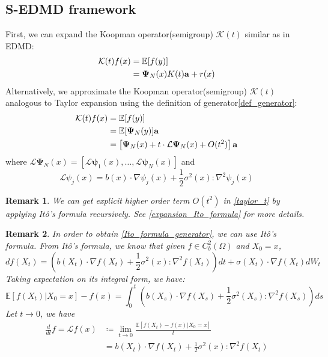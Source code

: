 \documentclass{article}[11]
\newtheorem*{remark}{Remark}
\begin{document}
\subsection*{S-EDMD framework}
First, we can expand the Koopman operator(semigroup) $\mathcal{K}(t)$ similar as in EDMD:
\begin{align}\label{edmd_expansion}
	\mathcal{K}(t) f(x) 
	&= \mathbb{E}[f(y)] \notag\\
	&= \mathbf{\Psi}_N(x)K(t)\mathbf{a} + r(x) 
\end{align}
Alternatively, we approximate the Koopman operator(semigroup) $\mathcal{K}(t)$ analogous to Taylor expansion using the definition of generator\eqref{def_generator}:
\begin{align}\label{taylor_t}
	\mathcal{K}(t)f(x) &= \mathbb{E}[f(y)] \notag\\
	&= \mathbb{E}[\mathbf{\Psi}_N(y)]\mathbf{a} \notag\\
	&= \left[ \mathbf{\Psi}_N(x) + t \cdot \mathcal{L}\mathbf{\Psi}_N(x) + O(t^2)  \right]\mathbf{a}
\end{align}
where $\mathcal{L}\mathbf{\Psi}_N(x) = \left[ \mathcal{L}\mathbf{\psi}_1(x), \dots, \mathcal{L}\mathbf{\psi}_N(x) \right]$ and
\begin{equation}\label{Ito_formula_generator}
	\mathcal{L}\psi_j(x) = b(x)\cdot \nabla\psi_j(x) + \frac{1}{2}\sigma^2(x)\colon \nabla^2 \psi_j(x)
\end{equation}
\begin{remark}
	We can get explicit higher order term $O(t^2)$ in \eqref{taylor_t} by applying It\^{o}'s formula recursively. See \ref{expansion_Ito_formula} for more details.
\end{remark}
\begin{remark}
	In order to obtain \eqref{Ito_formula_generator}, we can use It\^{o}'s formula. From It\^{o}'s formula, we know that given $f\in C_b^2(\Omega)$ and $X_0=x$,
	$$ df(X_t) = \left(b(X_t)\cdot \nabla f(X_t) + \frac{1}{2}\sigma^2(x)\colon \nabla^2 f(X_t)\right)dt + \sigma(X_t)\cdot \nabla f(X_t)dW_t $$
	Taking expectation on its integral form, we have: 
	$$\mathbb{E}[f(X_t)|X_0=x]-f(x) = \int_0^t \left( b(X_s)\cdot \nabla f(X_s) + \frac{1}{2}\sigma^2(X_s)\colon \nabla^2 f(X_s) \right) ds$$
	Let $t \to 0$, we have
	\begin{align*}
		\frac{d}{dt}f = \mathcal{L}f(x) &\coloneqq \lim_{t \to 0} \frac{\mathbb{E}[f(X_t)-f(x)|X_0=x]}{t} \\
		&= b(X_t)\cdot \nabla f(X_t) + \frac{1}{2}\sigma^2(x)\colon \nabla^2 f(X_t)
	\end{align*}
\end{remark}
\end{document}
